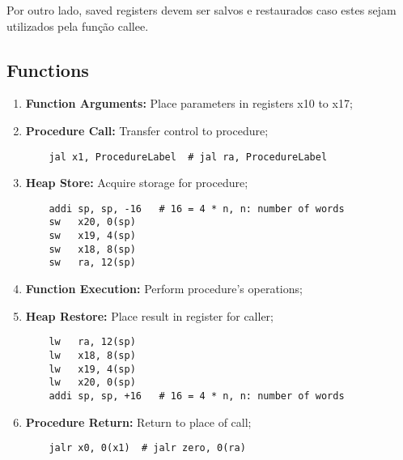\documentclass{article}
\begin{document}
\noindent Por outro lado, saved registers devem ser salvos e restaurados caso estes sejam utilizados pela função callee.

\subsection{Functions}
    \begin{enumerate}[rightmargin = \leftmargin]
        \item \textbf{Function Arguments:} Place parameters in registers x10 to x17;
        \item \textbf{Procedure Call:} Transfer control to procedure;
        \begin{scriptsize}
            \myStyleRISCV
            \begin{lstlisting}
    jal x1, ProcedureLabel  # jal ra, ProcedureLabel
            \end{lstlisting}
        \end{scriptsize}
        \item \textbf{Heap Store:} Acquire storage for procedure;
        \begin{scriptsize}
            \myStyleRISCV
            \begin{lstlisting}
    addi sp, sp, -16   # 16 = 4 * n, n: number of words
    sw   x20, 0(sp)
    sw   x19, 4(sp)
    sw   x18, 8(sp)
    sw   ra, 12(sp)
            \end{lstlisting}
        \end{scriptsize}
        \item \textbf{Function Execution:} Perform procedure's operations;
        \item \textbf{Heap Restore:} Place result in register for caller;
        \begin{scriptsize}
            \myStyleRISCV
            \begin{lstlisting}
    lw   ra, 12(sp)
    lw   x18, 8(sp)
    lw   x19, 4(sp)
    lw   x20, 0(sp)
    addi sp, sp, +16   # 16 = 4 * n, n: number of words
            \end{lstlisting}
        \end{scriptsize}
        \item \textbf{Procedure Return:} Return to place of call;
        \begin{scriptsize}
            \myStyleRISCV
            \begin{lstlisting}
    jalr x0, 0(x1)  # jalr zero, 0(ra)
            \end{lstlisting}
        \end{scriptsize}
    \end{enumerate}
\end{document}
